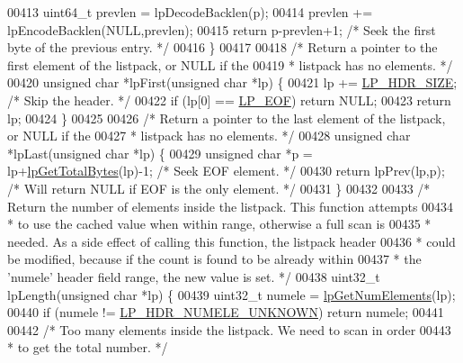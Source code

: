 \begin{DoxyCode}
00413     uint64\_t prevlen = lpDecodeBacklen(p);
00414     prevlen += lpEncodeBacklen(NULL,prevlen);
00415     \textcolor{keywordflow}{return} p-prevlen+1; \textcolor{comment}{/* Seek the first byte of the previous entry. */}
00416 \}
00417 
00418 \textcolor{comment}{/* Return a pointer to the first element of the listpack, or NULL if the}
00419 \textcolor{comment}{ * listpack has no elements. */}
00420 \textcolor{keywordtype}{unsigned} \textcolor{keywordtype}{char} *lpFirst(\textcolor{keywordtype}{unsigned} \textcolor{keywordtype}{char} *lp) \{
00421     lp += \hyperlink{listpack_8c_aa3fb94110f69a73ee90b4e63d8524dba}{LP\_HDR\_SIZE}; \textcolor{comment}{/* Skip the header. */}
00422     \textcolor{keywordflow}{if} (lp[0] == \hyperlink{listpack_8c_aa11b422dc597c4352da2abf522692774}{LP\_EOF}) \textcolor{keywordflow}{return} NULL;
00423     \textcolor{keywordflow}{return} lp;
00424 \}
00425 
00426 \textcolor{comment}{/* Return a pointer to the last element of the listpack, or NULL if the}
00427 \textcolor{comment}{ * listpack has no elements. */}
00428 \textcolor{keywordtype}{unsigned} \textcolor{keywordtype}{char} *lpLast(\textcolor{keywordtype}{unsigned} \textcolor{keywordtype}{char} *lp) \{
00429     \textcolor{keywordtype}{unsigned} \textcolor{keywordtype}{char} *p = lp+\hyperlink{listpack_8c_a18d79dc11f1002b8c367eab243912a36}{lpGetTotalBytes}(lp)-1; \textcolor{comment}{/* Seek EOF element. */}
00430     \textcolor{keywordflow}{return} lpPrev(lp,p); \textcolor{comment}{/* Will return NULL if EOF is the only element. */}
00431 \}
00432 
00433 \textcolor{comment}{/* Return the number of elements inside the listpack. This function attempts}
00434 \textcolor{comment}{ * to use the cached value when within range, otherwise a full scan is}
00435 \textcolor{comment}{ * needed. As a side effect of calling this function, the listpack header}
00436 \textcolor{comment}{ * could be modified, because if the count is found to be already within}
00437 \textcolor{comment}{ * the 'numele' header field range, the new value is set. */}
00438 uint32\_t lpLength(\textcolor{keywordtype}{unsigned} \textcolor{keywordtype}{char} *lp) \{
00439     uint32\_t numele = \hyperlink{listpack_8c_a6c5657a15231eb538939e10677c8ef1f}{lpGetNumElements}(lp);
00440     \textcolor{keywordflow}{if} (numele != \hyperlink{listpack_8c_aabaec596aac6d7d8370b7d801638b022}{LP\_HDR\_NUMELE\_UNKNOWN}) \textcolor{keywordflow}{return} numele;
00441 
00442     \textcolor{comment}{/* Too many elements inside the listpack. We need to scan in order}
00443 \textcolor{comment}{     * to get the total number. */}

\end{DoxyCode}
